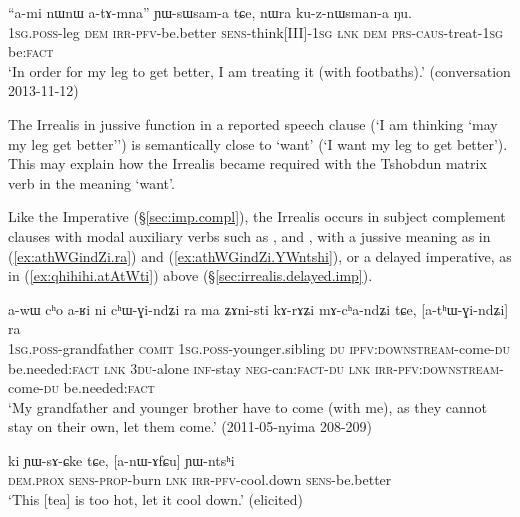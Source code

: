 \begin{exe}
\ex \label{ex:atAmna.YWsWsama}
\gll  ``a-mi nɯnɯ a-tɤ-mna'' ɲɯ-sɯsam-a tɕe, nɯra ku-z-nɯsman-a ŋu. \\
\textsc{1sg}.\textsc{poss}-leg \textsc{dem} \textsc{irr}-\textsc{pfv}-be.better \textsc{sens}-think[III]-\textsc{1sg} \textsc{lnk} \textsc{dem} \textsc{prs}-\textsc{caus}-treat-\textsc{1sg} be:\textsc{fact} \\
\glt `In order for my leg to get better, I am treating it (with footbaths).' (conversation 2013-11-12)
\end{exe}

The Irrealis in jussive function in a reported speech clause (`I am thinking `may my leg get better'') is semantically close to `want' (`I want my leg to get better'). This may explain how the Irrealis became required with the Tshobdun matrix verb  in the meaning `want'. 


Like the Imperative (§\ref{sec:imp.compl}), the Irrealis occurs in subject complement clauses with modal auxiliary verbs such as ,  and , with a jussive meaning as in (\ref{ex:athWGindZi.ra}) and (\ref{ex:athWGindZi.YWntshi}), or a delayed imperative, as in (\ref{ex:qhihihi.atAtWti}) above (§\ref{sec:irrealis.delayed.imp}).

\begin{exe}
\ex \label{ex:athWGindZi.ra}
\gll a-wɯ cʰo a-ʁi ni cʰɯ-ɣi-ndʑi ra ma  ʑɤni-sti kɤ-rɤʑi mɤ-cʰa-ndʑi tɕe, [a-tʰɯ-ɣi-ndʑi] ra \\
\textsc{1sg}.\textsc{poss}-grandfather \textsc{comit} \textsc{1sg}.\textsc{poss}-younger.sibling \textsc{du} \textsc{ipfv}:\textsc{downstream}-come-\textsc{du} be.needed:\textsc{fact} \textsc{lnk} \textsc{3du}-alone \textsc{inf}-stay \textsc{neg}-can:\textsc{fact}-\textsc{du} \textsc{lnk} \textsc{irr}-\textsc{pfv}:\textsc{downstream}-come-\textsc{du} be.needed:\textsc{fact} \\
\glt `My grandfather and younger brother have to come (with me), as they cannot stay on their own, let them come.' (2011-05-nyima 208-209)
\end{exe}

\begin{exe}
\ex \label{ex:athWGindZi.YWntshi}
\gll ki ɲɯ-sɤ-ɕke tɕe, [a-nɯ-ɤfɕu] ɲɯ-ntsʰi \\
\textsc{dem}.\textsc{prox} \textsc{sens}-\textsc{prop}-burn \textsc{lnk} \textsc{irr}-\textsc{pfv}-cool.down \textsc{sens}-be.better \\
\glt `This [tea] is too hot, let it cool down.' (elicited)
\end{exe}

